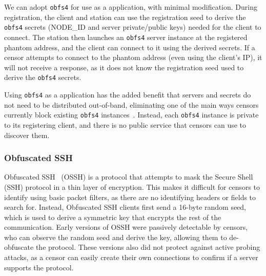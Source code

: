 \documentclass[sigconf,anonymous]{acmart}
\begin{document}
We can adopt \texttt{obfs4} for use as a \scheme application, with minimal
modification. During
registration, the \scheme client and station can use the registration seed to
derive the \texttt{obfs4} secrets (NODE\_ID and server private/public keys)
needed for the client to connect. The station then launches an \texttt{obfs4} server
instance at the registered phantom address, and the client can connect to it using the
derived secrets. If a censor attempts to connect to the phantom address (even
using the client's IP), it will not receive a response, as it does not know the
registration seed used to derive the \texttt{obfs4} secrets.

Using \texttt{obfs4} as a \scheme application has the added benefit that servers
and secrets do not need to be distributed out-of-band, eliminating one of the
main ways censors currently block existing \texttt{obfs4}
instances~\cite{tor-bridge-blocking-blog}. Instead, each \scheme \texttt{obfs4}
instance is private to its registering client, and there is no public service
that censors can use to discover them.





\subsubsection{Obfuscated SSH}
\label{sec:ossh}

Obfuscated SSH~\cite{ossh} (OSSH) is a protocol that attempts to mask the Secure Shell
(SSH) protocol in a thin
layer of encryption. This makes it difficult for censors to identify using basic
packet filters, as there are no identifying headers or fields
to search for. Instead, Obfuscated SSH clients first send a 16-byte random seed, which
is used to derive a symmetric key that encrypts the rest of the
communication. Early versions of OSSH were passively detectable by censors, who
can observe the random seed and derive the key, allowing them to de-obfuscate the protocol.
These versions also did
not protect against active probing attacks, as a censor can easily create their
own connections to confirm if a server supports the protocol.
\end{document}
